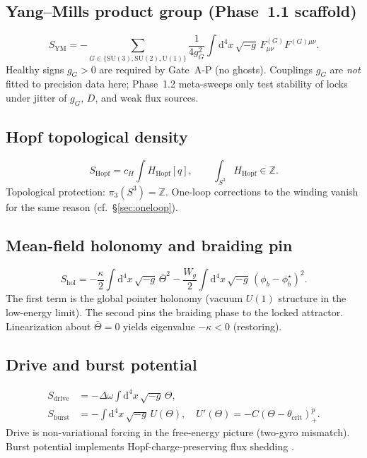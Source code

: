 \documentclass[11pt]{article}
\begin{document}
\subsection{Yang--Mills product group (Phase~1.1 scaffold)}
\begin{equation}
S_{\mathrm{YM}}
=-\sum_{G\in\{\mathrm{SU}(3),\mathrm{SU}(2),\mathrm{U}(1)\}}
\frac{1}{4g_G^2}\int\mathrm{d}^4x\,\sqrt{-g}\,
F_{\mu\nu}^{(G)}F^{(G)\mu\nu}.
\label{eq:ym}
\end{equation}
Healthy signs $g_G>0$ are required by Gate~A-P (no ghosts). Couplings $g_G$ are
\emph{not} fitted to precision data here; Phase~1.2 meta-sweeps only test stability of
locks under jitter of $g_G$, $D$, and weak flux sources.

\subsection{Hopf topological density}
\begin{equation}
S_{\mathrm{Hopf}}
=c_H\int H_{\mathrm{Hopf}}[q],
\qquad \int_{S^3}H_{\mathrm{Hopf}}\in\mathbb{Z}.
\label{eq:hopf}
\end{equation}
Topological protection: $\pi_3(S^3)=\mathbb{Z}$. One-loop corrections to the winding
vanish for the same reason (cf.\ \S\ref{sec:oneloop}).

\subsection{Mean-field holonomy and braiding pin}
\begin{equation}
S_{\mathrm{hol}}
=-\frac{\kappa}{2}\int\mathrm{d}^4x\,\sqrt{-g}\,\bar\Theta^2
-\frac{W_g}{2}\int\mathrm{d}^4x\,\sqrt{-g}\,(\phi_b-\phi_b^\star)^2.
\label{eq:hol}
\end{equation}
The first term is the global pointer holonomy (vacuum $U(1)$ structure in the
low-energy limit). The second pins the braiding phase to the locked attractor.
Linearization about $\bar\Theta=0$ yields eigenvalue $-\kappa<0$ (restoring).

\subsection{Drive and burst potential}
\begin{align}
S_{\mathrm{drive}}
&=-\Delta\omega\int\mathrm{d}^4x\,\sqrt{-g}\,\Theta,
\label{eq:drive}
\\
S_{\mathrm{burst}}
&=-\int\mathrm{d}^4x\,\sqrt{-g}\,U(\Theta),
\quad
U'(\Theta)=-C(\Theta-\theta_{\mathrm{crit}})_+^{p}.
\label{eq:burst}
\end{align}
Drive is non-variational forcing in the free-energy picture (two-gyro mismatch).
Burst potential implements Hopf-charge-preserving flux shedding
\cite{burst}.
\end{document}
